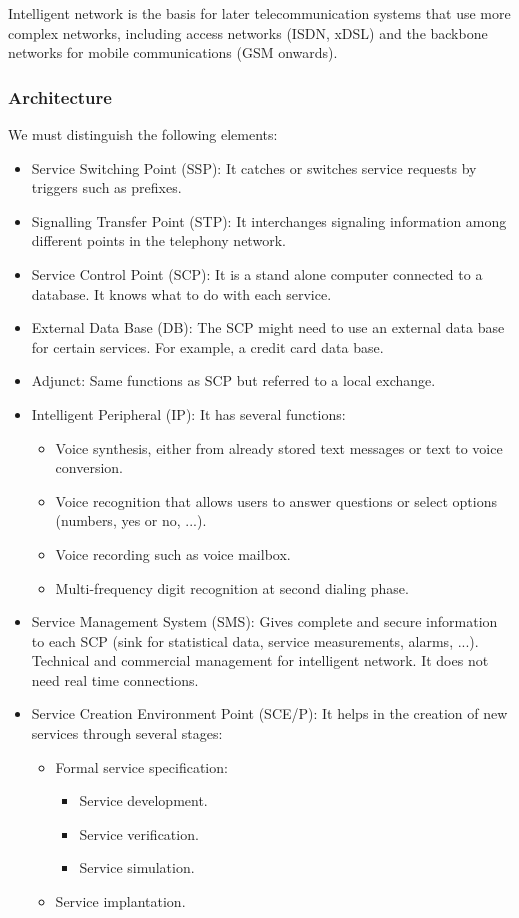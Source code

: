 \documentclass[
	12pt,
	twoside
]{book}
\begin{document}
Intelligent network is the basis for later telecommunication systems that use more complex networks, including access networks (ISDN, xDSL) and the backbone networks for mobile communications (GSM onwards).

\subsubsection{Architecture}

We must distinguish the following elements:

\begin{itemize}
	\item Service Switching Point (SSP): It catches or switches service requests by triggers such as prefixes.
	\item Signalling Transfer Point (STP): It interchanges signaling information among different points in the telephony network.
	\item Service Control Point (SCP): It is a stand alone computer connected to a database. It knows what to do with each service.
	\item External Data Base (DB): The SCP might need to use an external data base for certain services. For example, a credit card data base.
	\item Adjunct: Same functions as SCP but referred to a local exchange.
	\item {
		Intelligent Peripheral (IP): It has several functions:
		\begin{itemize}
			\item Voice synthesis, either from already stored text messages or text to voice conversion.
			\item Voice recognition that allows users to answer questions or select options (numbers, yes or no, ...).
			\item Voice recording such as voice mailbox.
			\item Multi-frequency digit recognition at second dialing phase.
		\end{itemize}
	}
	\item Service Management System (SMS): Gives complete and secure information to each SCP (sink for statistical data, service measurements, alarms, ...). Technical and commercial management for intelligent network. It does not need real time connections.
	\item {
		Service Creation Environment Point (SCE/P): It helps in the creation of new services through several stages:
		\begin{itemize}
			\item {
				Formal service specification:
				\begin{itemize}
					\item Service development.
					\item Service verification.
					\item Service simulation.
				\end{itemize}
			}
			\item Service implantation.
		\end{itemize}
	}
\end{itemize}
\end{document}
